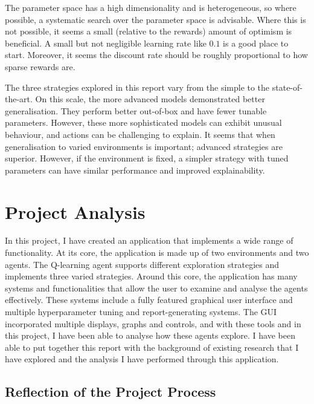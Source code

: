 \documentclass[]{final_report}
\begin{document}
The parameter space has a high dimensionality and is heterogeneous, so where possible, a systematic search over the parameter space is advisable. Where this is not possible, it seems a small (relative to the rewards) amount of optimism is beneficial. A small but not negligible learning rate like $0.1$ is a good place to start. Moreover, it seems the discount rate should be roughly proportional to how sparse rewards are. 

The three strategies explored in this report vary from the simple to the state-of-the-art. On this scale, the more advanced models demonstrated better generalisation. They perform better out-of-box and have fewer tunable parameters. However, these more sophisticated models can exhibit unusual behaviour, and actions can be challenging to explain. It seems that when generalisation to varied environments is important; advanced strategies are superior. However, if the environment is fixed, a simpler strategy with tuned parameters can have similar performance and improved explainability.

\chapter{Project Analysis}
\label{chap:project-analysis}
In this project, I have created an application that implements a wide range of functionality. At its core, the application is made up of two environments and two agents. The Q-learning agent supports different exploration strategies and implements three varied strategies. Around this core, the application has many systems and functionalities that allow the user to examine and analyse the agents effectively. These systems include a fully featured graphical user interface and multiple hyperparameter tuning and report-generating systems. The GUI incorporated multiple displays, graphs and controls, and with these tools and in this project, I have been able to analyse how these agents explore. I have been able to put together this report with the background of existing research that I have explored and the analysis I have performed through this application. 

\section{Reflection of the Project Process}
\end{document}
